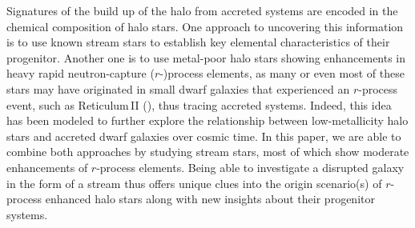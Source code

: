 \documentclass[twocolumn]{aastex63}
\begin{document}
Signatures of the build up of the halo from accreted systems are encoded in the chemical composition of halo stars. One approach to uncovering this information is to use known stream stars to establish key elemental characteristics of their progenitor. Another one is to use metal-poor halo stars showing enhancements in heavy rapid neutron-capture ($r$-)process elements, as many or even most of these stars may have originated in small dwarf galaxies that experienced an $r$-process event, such as Reticulum\,II (\citealt{Ji16a,Ji16b,Roederer16b,Roederer18}), thus tracing accreted systems. Indeed, this idea has been modeled \citep{brauer19} to further explore the relationship between  low-metallicity halo stars and accreted dwarf galaxies over cosmic time. In this paper, we are able to combine both approaches by studying stream stars, most of which show moderate enhancements of $r$-process elements. Being able to investigate a disrupted galaxy in the form of a stream thus offers unique clues into the origin scenario(s) of $r$-process enhanced halo stars along with new insights about their progenitor systems.
\end{document}
